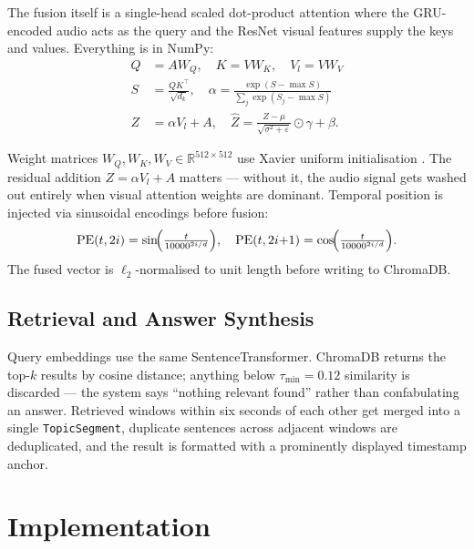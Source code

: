 \documentclass[conference]{IEEEtran}
\begin{document}
The fusion itself is a single-head scaled dot-product attention where
the GRU-encoded audio acts as the query and the ResNet visual features
supply the keys and values. Everything is in NumPy:
\begin{align}
  Q &= A W_Q,\quad K = V W_K,\quad V_l = V W_V \\
  S &= \tfrac{QK^\top}{\sqrt{d_k}},\quad
  \alpha = \tfrac{\exp(S-\max S)}{\textstyle\sum_j \exp(S_j-\max S)} \\
  Z &= \alpha V_l + A,\quad
  \hat{Z} = \tfrac{Z-\mu}{\sqrt{\sigma^2+\varepsilon}}\odot\gamma+\beta.
\end{align}

Weight matrices $W_Q, W_K, W_V \in \mathbb{R}^{512\times 512}$ use Xavier
uniform initialisation \cite{glorot2010init}. The residual addition $Z = \alpha V_l + A$
matters --- without it, the audio signal gets washed out entirely when
visual attention weights are dominant. Temporal position is injected via
sinusoidal encodings before fusion:
\begin{equation}
  \text{PE}(t,2i)=\sin\!\Bigl(\tfrac{t}{10000^{2i/d}}\Bigr),\quad
  \text{PE}(t,2i{+}1)=\cos\!\Bigl(\tfrac{t}{10000^{2i/d}}\Bigr).
\end{equation}
The fused vector is $\ell_2$-normalised to unit length before writing to
ChromaDB.

\subsection{Retrieval and Answer Synthesis}

Query embeddings use the same SentenceTransformer. ChromaDB returns the
top-$k$ results by cosine distance; anything below $\tau_{\min}=0.12$
similarity is discarded --- the system says ``nothing relevant found''
rather than confabulating an answer. Retrieved windows within six seconds
of each other get merged into a single \texttt{TopicSegment}, duplicate
sentences across adjacent windows are deduplicated, and the result is
formatted with a prominently displayed timestamp anchor.

\section{Implementation}
\end{document}
